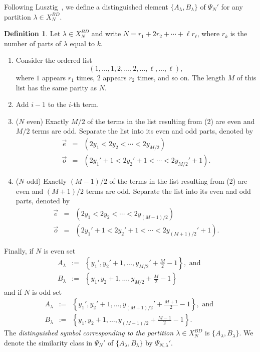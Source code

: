 \documentclass[reqno,11pt]{amsart}
\theoremstyle{remark}
\theoremstyle{remark}
\theoremstyle{definition}
\theoremstyle{definition}
\theoremstyle{definition}
\newtheorem{Def}[Thm]{Definition}
\numberwithin{equation}{section}
\begin{document}
Following Lusztig~\cite[\S 11.7]{Lu84}, we define a distinguished element $\{A_\lambda, B_\lambda\}$ of $\Psi_{N}'$ for any partition $\lambda\in X_{N}^{BD}$.  
\begin{Def} Let $\lambda\in X_{N}^{BD}$ and write $N = r_1+2r_2+\cdots + \ell r_\ell$, where $r_k$ is the number of parts of $\lambda$ equal to $k$. 
\begin{enumerate}
\item Consider the ordered list
\[
(1,\ldots, 1, 2, \ldots, 2, \ldots, \ell, \ldots, \ell),
\]
where $1$ appears $r_1$ times, $2$ appears $r_2$ times, and so on. The length $M$ of this list has the same parity as $N$. 
\item Add $i-1$ to the $i$-th term.
\item ($N$ even) Exactly $M/2$ of the terms in the list resulting from (2) are even and $M/2$ terms are odd. Separate the list into its even and odd parts, denoted by 
\begin{eqnarray*}
\vec{e} &=& (2y_1<2y_2<\cdots < 2y_{M/2})\\
\vec{o} &=& (2y_1'+1< 2y_2'+1<\cdots < 2y_{M/2}'+1).
\end{eqnarray*}
\item ($N$ odd) Exactly $(M-1)/2$ of the terms in the list resulting from (2) are even and $(M+1)/2$ terms are odd. Separate the list into its even and odd parts, denoted by 
\begin{eqnarray*}
\vec{e} &=& (2y_1<2y_2<\cdots < 2y_{(M-1)/2})\\ 
\vec{o} &=& (2y_1'+1< 2y_2'+1<\cdots < 2y_{(M+1)/2}'+1).
\end{eqnarray*}
\end{enumerate}
Finally, if $N$ is even set 
\begin{eqnarray*}
A_\lambda &:=& \left\{ y_1', y_2'+1, \ldots, y_{M/2}'+\tfrac{M}{2}-1 \right\}, \text{ and } \\
 B_\lambda &:=& \left\{y_1, y_2+1, \ldots, y_{M/2}+\tfrac{M}{2} -1 \right\}
\end{eqnarray*}
and if $N$ is odd set
\begin{eqnarray*}
A_\lambda &:=& \left\{ y_1', y_2'+1, \ldots, y_{(M+1)/2}'+\tfrac{M+1}{2}-1 \right\}, \text{ and } \\
 B_\lambda &:=& \left\{y_1, y_2+1, \ldots, y_{(M-1)/2}+\tfrac{M-1}{2}-1 \right\}.
\end{eqnarray*}
The \emph{distinguished symbol corresponding to the partition $\lambda\in X_N^{BD}$} is $\{A_\lambda, B_\lambda\}$. We denote the similarity class in $\Psi_{N}'$ of $\{A_\lambda, B_{\lambda}\}$ by $\Psi_{N,\lambda}'$.
\end{Def}
\end{document}
